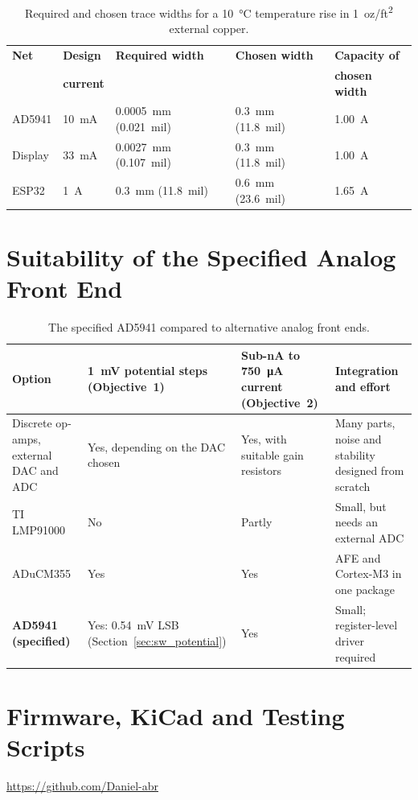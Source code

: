 \begin{table}[htbp]
  \centering
  \small
  \caption{Required and chosen trace widths for a \SI{10}{\celsius}
    temperature rise in 1~oz/ft\textsuperscript{2} external copper.}
  \label{tab:hw_trace_widths}
  \begin{tabular}{@{}lllll@{}}
    \toprule
    \textbf{Net} & \textbf{Design} & \textbf{Required width}
      & \textbf{Chosen width} & \textbf{Capacity of} \\
     & \textbf{current} & & & \textbf{chosen width} \\
    \midrule
    AD5941  & \SI{10}{\milli\ampere} & \SI{0.0005}{\milli\metre} (0.021~mil)
      & \SI{0.3}{\milli\metre} (11.8~mil) & \SI{1.00}{\ampere} \\
    Display & \SI{33}{\milli\ampere} & \SI{0.0027}{\milli\metre} (0.107~mil)
      & \SI{0.3}{\milli\metre} (11.8~mil) & \SI{1.00}{\ampere} \\

    ESP32   & \SI{1}{\ampere}        & \SI{0.3}{\milli\metre} (11.8~mil)
      & \SI{0.6}{\milli\metre} (23.6~mil) & \SI{1.65}{\ampere} \\
    \bottomrule
  \end{tabular}
\end{table}


\section{Suitability of the Specified Analog Front End}
\label{app:afe_choice}

\begin{table}[H]
  \centering
  \small
  \renewcommand\tabularxcolumn[1]{p{#1}}
  \caption{The specified AD5941 compared to alternative analog front ends.}
  \label{tab:afe_choice}
  \begin{tabularx}{\textwidth}{@{}>{\raggedright\arraybackslash}p{2.6cm} >{\raggedright\arraybackslash}X >{\raggedright\arraybackslash}X >{\raggedright\arraybackslash}X@{}}
    \toprule
    \textbf{Option} & \textbf{\SI{1}{\milli\volt} potential steps (Objective~1)} & \textbf{Sub-nA to \SI{750}{\micro\ampere} current (Objective~2)} & \textbf{Integration and effort} \\
    \midrule
    Discrete op-amps, external DAC and ADC
      & Yes, depending on the DAC chosen
      & Yes, with suitable gain resistors
      & Many parts, noise and stability designed from scratch \\
    TI LMP91000
      & No
      & Partly
      & Small, but needs an external ADC \\
    ADuCM355
      & Yes
      & Yes
      & AFE and Cortex-M3 in one package \\
    \textbf{AD5941 (specified)}
      & Yes: \SI{0.54}{\milli\volt} LSB (Section~\ref{sec:sw_potential})
      & Yes
      & Small; register-level driver required \\
    \bottomrule
  \end{tabularx}
\end{table}



\section{Firmware, KiCad and Testing Scripts}
\label{app:git}

\url{https://github.com/Daniel-abr}
